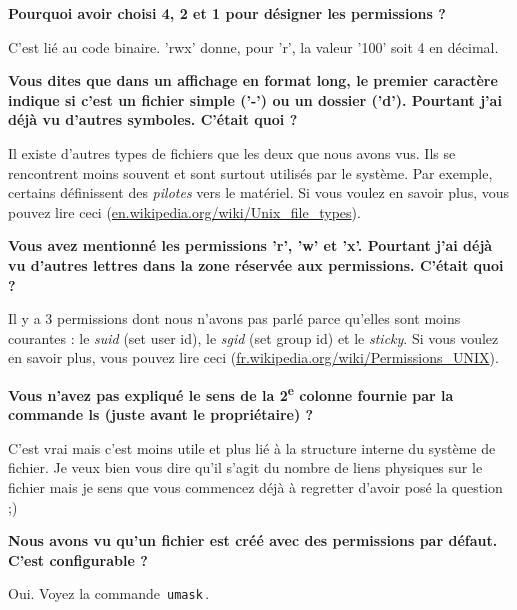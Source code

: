 \documentclass[a4paper,11pt]{article}
\begin{document}
\par
\textbf{Pourquoi avoir choisi 4, 2 et 1 pour d\'esigner les permissions ?}
\par

C'est li\'e au code binaire. 'rwx' donne, pour 'r', la valeur '100' soit 4 en d\'ecimal.  

\par
\textbf{Vous dites que dans un affichage en format long, 
	le premier caract\`ere indique si c'est un fichier simple ('-') ou un dossier ('d'). 
	Pourtant j'ai d\'ej\`a vu d'autres symboles. C'\'etait quoi ?
}
\par

Il existe d'autres types de fichiers que les deux que nous avons vus. 
Ils se rencontrent moins souvent et sont surtout utilis\'es par le syst\`eme.
Par exemple, certains d\'efinissent des \textit{pilotes} vers le mat\'eriel. 
Si vous voulez en savoir plus, vous pouvez lire
ceci (\url{en.wikipedia.org/wiki/Unix\_file\_types}).  

\par
\textbf{Vous avez mentionn\'e les permissions 'r', 'w' et 'x'. 
	Pourtant j'ai d\'ej\`a vu d'autres lettres dans la zone r\'eserv\'ee aux permissions. 
	C'\'etait quoi ?
}
\par

Il y a 3 permissions dont nous n'avons pas parl\'e parce qu'elles sont moins courantes : 
le \textit{suid} (set user id), 
le \textit{sgid} (set group id) 
et le \textit{sticky}. 
Si vous voulez en savoir plus, vous pouvez lire   
ceci (\url{fr.wikipedia.org/wiki/Permissions\_UNIX}).  

\par
\textbf{Vous n'avez pas expliqu\'e le sens de la 2\textsuperscript{e} colonne 
	fournie par la commande ls (juste avant le propri\'etaire) ?
}
\par

C'est vrai mais c'est moins utile et plus li\'e \`a la structure interne du syst\`eme de fichier. 
Je veux bien vous dire qu'il s'agit du nombre de liens physiques sur le fichier 
mais je sens que vous commencez d\'ej\`a \`a regretter d'avoir pos\'e la question ;)  

\par
\textbf{Nous avons vu qu'un fichier est cr\'e\'e avec des permissions par d\'efaut. 
	C'est configurable ?
}
\par

Oui. Voyez la commande \,\verb|umask|\,.  

\par
\end{document}
